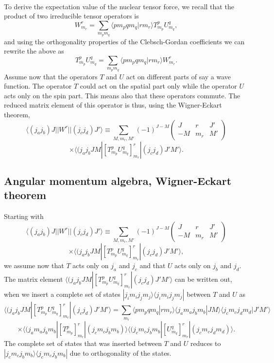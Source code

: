 \documentclass[%
twoside,                 %
final,                   %
10pt]{article}
\begin{document}
\paragraph{}
To derive the expectation value of the nuclear tensor force, we recall that 
the product of two irreducible tensor operators is
\[
W^{r}_{m_r}=\sum_{m_pm_q}\langle pm_pqm_q|rm_r\rangle T^{p}_{m_p}U^{q}_{m_q},
\] 
and using the orthogonality properties of the Clebsch-Gordan coefficients we can rewrite the above as
\[
T^{p}_{m_p}U^{q}_{m_q}=\sum_{m_pm_q}\langle pm_pqm_q|rm_r\rangle W^{r}_{m_r}.
\] 
Assume now that the operators $T$ and $U$ act on different parts of say a wave function. The operator $T$ could act on the spatial part only while the operator $U$ acts only on the spin part. This means also that these operators commute.
The reduced matrix element of this operator is thus, using the Wigner-Eckart theorem,
\[
\langle (j_aj_b)J||W^{r}||(j_cj_d)J'\rangle\equiv\sum_{M,m_r,M'}(-1)^{J-M}\left(\begin{array}{ccc}  J & r & J' \\ -M & m_r & M'\end{array}\right)
\]
\[
\times\langle (j_aj_bJM|\left[ T^{p}_{m_p}U^{q}_{m_q} \right]^{r}_{m_r}|(j_cj_d)J'M'\rangle.
\]



\subsection{Angular momentum algebra, Wigner-Eckart theorem}

\paragraph{}
Starting with
\[
\langle (j_aj_b)J||W^{r}||(j_cj_d)J'\rangle\equiv\sum_{M,m_r,M'}(-1)^{J-M}\left(\begin{array}{ccc}  J & r & J' \\ -M & m_r & M'\end{array}\right)
\]
\[
\times\langle (j_aj_bJM|\left[ T^{p}_{m_p}U^{q}_{m_q} \right]^{r}_{m_r}|(j_cj_d)J'M'\rangle,
\]
we assume now that $T$ acts only on $j_a$ and $j_c$ and that $U$ acts only on $j_b$ and $j_d$. 
The matrix element $\langle (j_aj_bJM|\left[ T^{p}_{m_p}U^{q}_{m_q} \right]^{r}_{m_r}|(j_cj_d)J'M'\rangle$ can be written out,
when we insert a complete set of states $|j_im_ij_jm_j\rangle\langle j_im_ij_jm_j|$ between $T$ and $U$ as
\[
\langle (j_aj_bJM|\left[ T^{p}_{m_p}U^{q}_{m_q} \right]^{r}_{m_r}|(j_cj_d)J'M'\rangle=\sum_{m_i}\langle pm_pqm_q|rm_r\rangle\langle j_am_aj_bm_b|JM\rangle\langle j_cm_cj_dm_d|J'M'\rangle
\]
\[
\times \langle (j_am_aj_bm_b|\left[ T^{p}_{m_p}\right]^{r}_{m_r}|(j_cm_cj_bm_b)\rangle\langle (j_cm_cj_bm_b|\left[ U^{q}_{m_q}\right]^{r}_{m_r}|(j_cm_cj_dm_d)\rangle.
\]
The complete set of states that was inserted between $T$ and $U$ reduces to $|j_cm_cj_bm_b\rangle\langle j_cm_cj_bm_b|$
due to orthogonality of the states.
\end{document}
